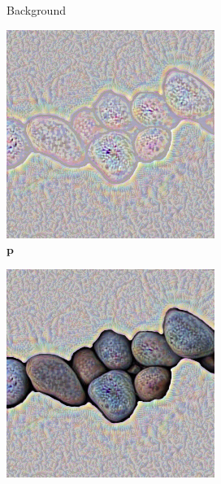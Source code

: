 \begin{figure}[]
\begin{subfigure}{\textwidth}
\begin{subfigure}{0.24\textwidth}
            \caption{Background}
            \label{fig:ex01-pebbles-5steps-some_bg}
        \end{subfigure}
        \hfill
        \begin{subfigure}{0.24\textwidth}
            \centering
            \includegraphics[width=\textwidth]{images/04-experiment01/pebbles/5/some_im.jpg}
            \caption{\(\bm{p}\)}
            \label{fig:ex01-pebbles-5steps-some_im}
        \end{subfigure}
        \hfill
        \begin{subfigure}{0.24\textwidth}
            \centering
            \includegraphics[width=\textwidth]{images/04-experiment01/pebbles/5/some_proj.jpg}

\end{subfigure}
\end{subfigure}
\end{figure}
